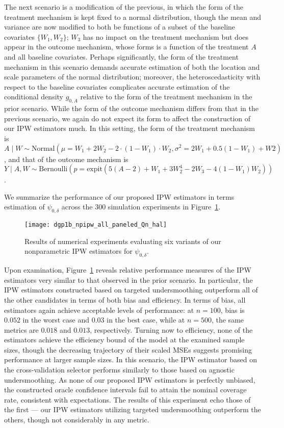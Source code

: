 The next scenario is a modification of the previous, in which the form of the
treatment mechanism is kept fixed to a normal distribution, though the mean and
variance are now modified to both be functions of a subset of the baseline
covariates $\{W_1, W_2\}$; $W_3$ has no impact on the treatment mechanism but
does appear in the outcome mechanism, whose forms is a function of the treatment
$A$ and all baseline covariates. Perhaps significantly, the form of the
treatment mechanism in this scenario demands accurate estimation of both the
location and scale parameters of the normal distribution; moreover, the
heteroscedasticity with respect to the baseline covariates complicates accurate
estimation of the conditional density $g_{0,A}$ relative to the form of the
treatment mechanism in the prior scenario. While the form of the outcome
mechanism differs from that in the previous scenario, we again do not expect its
form to affect the construction of our IPW estimators much. In this setting, the
form of the treatment mechanism is $A \mid W \sim \text{Normal}\left(\mu = W_1
+ 2 W_2 - 2 \cdot (1 - W_1) \cdot W_2, \sigma^2 = 2 W_1 + 0.5 (1 - W_1) + W2
\right)$, and that of the outcome mechanism is $Y \mid A, W \sim
\text{Bernoulli}\left(p = \text{expit}(5 (A - 2) + W_1 + 3 W_2^4 - 2 W_3 - 4 (1
- W_1) W_2)\right)$.

We summarize the performance of our proposed IPW estimators in terms estimation
of $\psi_{0,\delta}$ across the $300$ simulation experiments in
Figure~\ref{fig:dgp1b_npipw}.
\begin{figure}[H]
  \centering
  \texttt{[image: dgp1b\_npipw\_all\_paneled\_Qn\_hal]}
  \caption{Results of numerical experiments evaluating six variants of our
  nonparametric IPW estimators for $\psi_{0,\delta}$.}
  \label{fig:dgp1b_npipw}
\end{figure}
Upon examination, Figure~\ref{fig:dgp1b_npipw} reveals relative performance
measures of the IPW estimators very similar to that observed in the prior
scenario. In particular, the IPW estimators constructed based on targeted
undersmoothing outperform all of the other candidates in terms of both bias and
efficiency. In terms of bias, all estimators again achieve acceptable levels of
performance: at $n=100$, bias is $0.052$ in the worst case and $0.03$ in the
best case, while at $n=500$, the same metrics are $0.018$ and $0.013$,
respectively. Turning now to efficiency, none of the estimators achieve the
efficiency bound of the model at the examined sample sizes, though the
decreasing trajectory of their scaled MSEs suggests promising performance at
larger sample sizes. In this scenario, the IPW estimator based on the
cross-validation selector performs similarly to those based on agnostic
undersmoothing. As none of our proposed IPW estimators is perfectly unbiased,
the constructed oracle confidence intervals fail to attain the nominal coverage
rate, consistent with expectations. The results of this experiment echo those of
the first --- our IPW estimators utilizing targeted undersmoothing outperform
the others, though not considerably in any metric.

